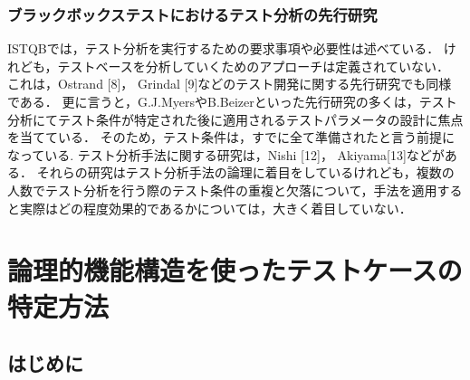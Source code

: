 \documentclass[a4paper,12pt]{jreport}
\begin{document}
\subsection{ブラックボックステストにおけるテスト分析の先行研究}
ISTQBでは，テスト分析を実行するための要求事項や必要性は述べている．
けれども，テストベースを分析していくためのアプローチは定義されていない．
これは，Ostrand [8]， Grindal [9]などのテスト開発に関する先行研究でも同様である．
更に言うと，G.J.MyersやB.Beizerといった先行研究の多くは，テスト分析にてテスト条件が特定された後に適用されるテストパラメータの設計に焦点を当てている．
そのため，テスト条件は，すでに全て準備されたと言う前提になっている.
テスト分析手法に関する研究は，Nishi [12]， Akiyama[13]などがある．
それらの研究はテスト分析手法の論理に着目をしているけれども，複数の人数でテスト分析を行う際のテスト条件の重複と欠落について，手法を適用すると実際はどの程度効果的であるかについては，大きく着目していない．




\chapter{論理的機能構造を使ったテストケースの特定方法}

\section{はじめに}
\end{document}
